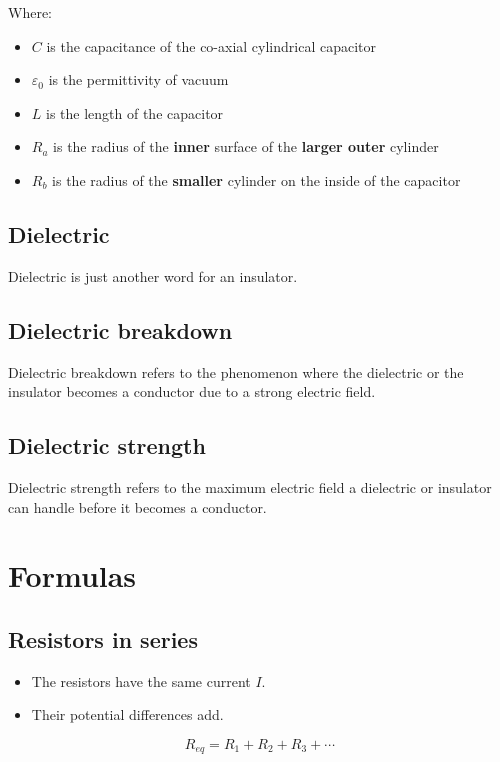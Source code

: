 \documentclass[11pt]{article}
\begin{document}
Where:
\begin{itemize}
\item \(C\) is the capacitance of the co-axial cylindrical capacitor
\item \(\varepsilon_0\) is the permittivity of vacuum
\item \(L\) is the length of the capacitor
\item \(R_a\) is the radius of the \textbf{inner} surface of the \textbf{larger outer} cylinder
\item \(R_b\) is the radius of the \textbf{smaller} cylinder on the inside of the capacitor
\end{itemize}

\subsection{Dielectric}
\label{sec:org8b654db}
Dielectric is just another word for an insulator.

\subsection{Dielectric breakdown}
\label{sec:org4782cd3}
Dielectric breakdown refers to the phenomenon where the dielectric or the insulator becomes a conductor due to a strong electric field.

\subsection{Dielectric strength}
\label{sec:orgfc4789c}
Dielectric strength refers to the maximum electric field a dielectric or insulator can handle before it becomes a conductor.


\section{Formulas}
\label{sec:orgacc980c}

\subsection{Resistors in series}
\label{sec:org88c1a85}
\begin{itemize}
\item The resistors have the same current \(I\).
\item Their potential differences add.
\end{itemize}
\[R_{eq} = R_1 + R_2 + R_3 + \cdots\]
\end{document}
